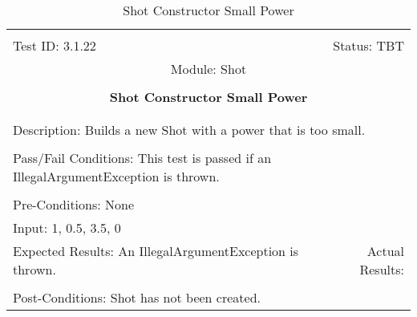 \documentclass[titlepage]{article}
\begin{document}
\begin{center}%
\begin{table}
\begin{tabular}{|l r|}\hline&\\[-2mm]
	Test ID: 3.1.22	&Status: TBT\\[-3mm]
	\multicolumn{2}{|c|}{Module: Shot}\\&\\
	\multicolumn{2}{|c|}{\textbf{\large{Shot Constructor Small Power}}}\\&\\\hline&\\[-3mm]
	\multicolumn{2}{|p{\textwidth}|}{Description: Builds a new Shot with a power that is too small.}\\[1mm]\hline&\\[-3mm]
	\multicolumn{2}{|p{\textwidth}|}{Pass/Fail Conditions: This test is passed if an IllegalArgumentException is thrown.}\\[1mm]\hline&\\[-3mm]
	\multicolumn{2}{|p{\textwidth}|}{Pre-Conditions: None}\\[4mm]
	\multicolumn{2}{|p{\textwidth}|}{Input: 1, 0.5, 3.5, 0}\\[2mm]\hline
	\multicolumn{1}{|p{0.49\textwidth}}{Expected Results: An IllegalArgumentException is thrown.}	&\multicolumn{1}{|p{0.45\textwidth}|}{Actual Results: }\\\hline&\\[-3mm]
	\multicolumn{2}{|p{\textwidth}|}{Post-Conditions: Shot has not been created.}\\\hline
\end{tabular}
\caption{Shot Constructor Small Power}
\end{table}
\end{center}
\end{document}
